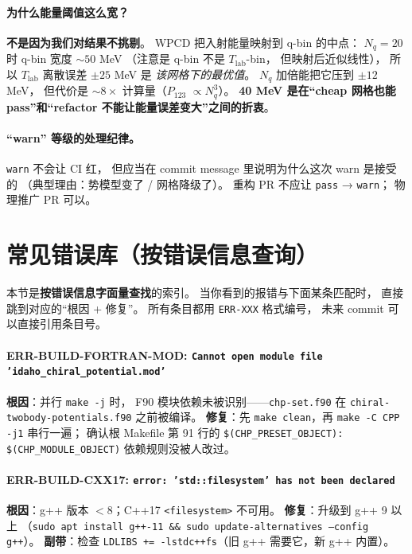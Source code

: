 \paragraph{为什么能量阈值这么宽？}
\textbf{不是因为我们对结果不挑剔}。
WPCD 把入射能量映射到 q-bin 的中点：
$N_q = 20$ 时 q-bin 宽度 $\sim 50$ MeV
（注意是 q-bin 不是 $T_{\mathrm{lab}}$-bin，
但映射后近似线性），
所以 $T_{\mathrm{lab}}$ 离散误差 $\pm 25$ MeV 是 \emph{该网格下的最优值}。
$N_q$ 加倍能把它压到 $\pm 12$ MeV，
但代价是 $\sim 8\times$ 计算量（$P_{123}$ $\propto N_q^3$）。
\textbf{40 MeV 是在“cheap 网格也能 pass”和“refactor 不能让能量误差变大”之间的折衷}。

\paragraph{“warn” 等级的处理纪律。}
\texttt{warn} 不会让 CI 红，
但应当在 commit message 里说明为什么这次 warn 是接受的
（典型理由：势模型变了 / 网格降级了）。
重构 PR 不应让 \texttt{pass} → \texttt{warn}；
物理推广 PR 可以。

\section{常见错误库（按错误信息查询）}
\label{sec:ch20-errors}

本节是\textbf{按错误信息字面量查找}的索引。
当你看到的报错与下面某条匹配时，
直接跳到对应的“根因 + 修复”。
所有条目都用 \texttt{ERR-XXX} 格式编号，
未来 commit 可以直接引用条目号。

\paragraph{ERR-BUILD-FORTRAN-MOD: \texttt{Cannot open module file 'idaho\_chiral\_potential.mod'}}
\textbf{根因}：并行 \texttt{make -j} 时，
F90 模块依赖未被识别——\texttt{chp-set.f90} 在
\texttt{chiral-twobody-potentials.f90} 之前被编译。
\textbf{修复}：先 \texttt{make clean}，再 \texttt{make -C CPP -j1} 串行一遍；
确认根 Makefile 第 91 行的
\texttt{\$(CHP\_PRESET\_OBJECT): \$(CHP\_MODULE\_OBJECT)}
依赖规则没被人改过。

\paragraph{ERR-BUILD-CXX17: \texttt{error: 'std::filesystem' has not been declared}}
\textbf{根因}：g++ 版本 $< 8$；C++17 \texttt{<filesystem>} 不可用。
\textbf{修复}：升级到 g++ 9 以上
（\texttt{sudo apt install g++-11 \&\& sudo update-alternatives --config g++}）。
\textbf{副带}：检查 \texttt{LDLIBS += -lstdc++fs}（旧 g++ 需要它，新 g++ 内置）。

